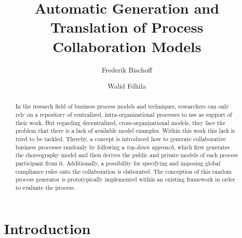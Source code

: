 \documentclass[runningheads]{llncs}
\begin{document}
%
\title{Automatic Generation and Translation of Process Collaboration Models}
%
%
\author{Frederik Bischoff \and Walid Fdhila}

%
%
%
\maketitle              %
%
\begin{abstract}
In the research field of business process models and techniques, researchers can only rely on a repository of centralized, intra-organizational processes to use as support of their work. But regarding decentralized, cross-organizational models, they face the problem that there is a lack of available model examples. Within this work this lack is tried to be tackled. Thereby, a concept is introduced how to generate collaborative business processes randomly by following a \textit{top-down approach}, which first generates the choreography model and then derives the public and private models of each process participant from it. Additionally, a possibility for specifying and imposing global compliance rules onto the collaboration is elaborated. The conception of this random process generator is prototypically implemented within an existing framework in order to evaluate the process.

\end{abstract}
%
%
%
\section{Introduction}

%
%
%


%
\end{document}
